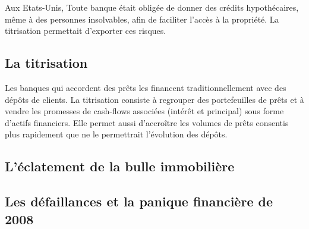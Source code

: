 Aux Etats-Unis, Toute banque était obligée de donner des crédits hypothécaires, même à des personnes insolvables, afin de faciliter l'accès à la propriété. La titrisation permettait d'exporter ces risques.
	
	\subsection{La titrisation}
	
	Les banques qui accordent des prêts les financent 
traditionnellement avec des dépôts de clients. 
	La titrisation consiste à regrouper des portefeuilles de prêts et à vendre les promesses de cash-flows associées (intérêt et principal) sous forme d'actifs financiers. Elle permet aussi d'accroître les volumes de prêts consentis plus rapidement que ne le permettrait l'évolution des dépôts. 
	
	\subsection{L'éclatement de la bulle immobilière}
	
	
	
	\subsection{Les défaillances et la panique financière de 2008}
	
	